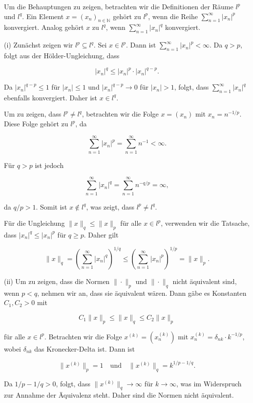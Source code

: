 Um die Behauptungen zu zeigen, betrachten wir die Definitionen der Räume \( l^p \) und \( l^q \). Ein Element \( x = (x_n)_{n \in \mathbb{N}} \) gehört zu \( l^p \), wenn die Reihe \( \sum_{n=1}^{\infty} |x_n|^p \) konvergiert. Analog gehört \( x \) zu \( l^q \), wenn \( \sum_{n=1}^{\infty} |x_n|^q \) konvergiert.

(i) Zunächst zeigen wir \( l^p \subseteq l^q \). Sei \( x \in l^p \). Dann ist \( \sum_{n=1}^{\infty} |x_n|^p < \infty \). Da \( q > p \), folgt aus der Hölder-Ungleichung, dass

\[
|x_n|^q \leq |x_n|^p \cdot |x_n|^{q-p}.
\]

Da \( |x_n|^{q-p} \leq 1 \) für \( |x_n| \leq 1 \) und \( |x_n|^{q-p} \to 0 \) für \( |x_n| > 1 \), folgt, dass \( \sum_{n=1}^{\infty} |x_n|^q \) ebenfalls konvergiert. Daher ist \( x \in l^q \).

Um zu zeigen, dass \( l^p \neq l^q \), betrachten wir die Folge \( x = (x_n) \) mit \( x_n = n^{-1/p} \). Diese Folge gehört zu \( l^p \), da

\[
\sum_{n=1}^{\infty} |x_n|^p = \sum_{n=1}^{\infty} n^{-1} < \infty.
\]

Für \( q > p \) ist jedoch

\[
\sum_{n=1}^{\infty} |x_n|^q = \sum_{n=1}^{\infty} n^{-q/p} = \infty,
\]

da \( q/p > 1 \). Somit ist \( x \notin l^q \), was zeigt, dass \( l^p \neq l^q \).

Für die Ungleichung \( \|x\|_q \leq \|x\|_p \) für alle \( x \in l^p \), verwenden wir die Tatsache, dass \( |x_n|^q \leq |x_n|^p \) für \( q \geq p \). Daher gilt

\[
\|x\|_q = \left( \sum_{n=1}^{\infty} |x_n|^q \right)^{1/q} \leq \left( \sum_{n=1}^{\infty} |x_n|^p \right)^{1/p} = \|x\|_p.
\]

(ii) Um zu zeigen, dass die Normen \( \|\cdot\|_p \) und \( \|\cdot\|_q \) nicht äquivalent sind, wenn \( p < q \), nehmen wir an, dass sie äquivalent wären. Dann gäbe es Konstanten \( C_1, C_2 > 0 \) mit

\[
C_1 \|x\|_p \leq \|x\|_q \leq C_2 \|x\|_p
\]

für alle \( x \in l^p \). Betrachten wir die Folge \( x^{(k)} = (x_n^{(k)}) \) mit \( x_n^{(k)} = \delta_{nk} \cdot k^{-1/p} \), wobei \( \delta_{nk} \) das Kronecker-Delta ist. Dann ist

\[
\|x^{(k)}\|_p = 1 \quad \text{und} \quad \|x^{(k)}\|_q = k^{1/p - 1/q}.
\]

Da \( 1/p - 1/q > 0 \), folgt, dass \( \|x^{(k)}\|_q \to \infty \) für \( k \to \infty \), was im Widerspruch zur Annahme der Äquivalenz steht. Daher sind die Normen nicht äquivalent.